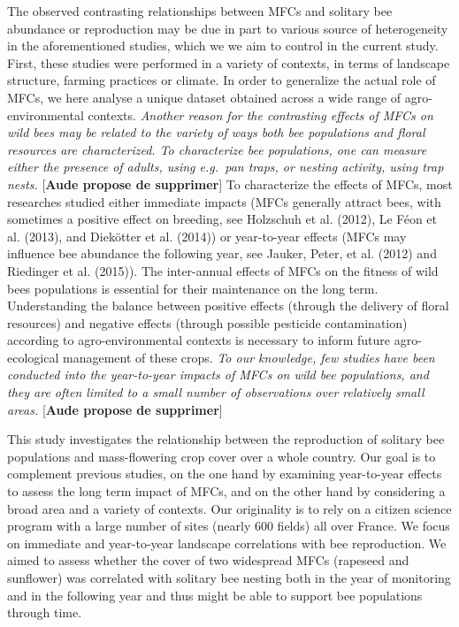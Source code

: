 \documentclass[smallextended]{svjour3}       %
\begin{document}
The observed contrasting relationships between MFCs and solitary bee
abundance or reproduction may be due in part to various source of
heterogeneity in the aforementioned studies, which we we aim to control
in the current study. First, these studies were performed in a variety
of contexts, in terms of landscape structure, farming practices or
climate. In order to generalize the actual role of MFCs, we here analyse
a unique dataset obtained across a wide range of agro-environmental
contexts. \emph{Another reason for the contrasting effects of MFCs on
wild bees may be related to the variety of ways both bee populations and
floral resources are characterized. To characterize bee populations, one
can measure either the presence of adults, using e.g.~pan traps, or
nesting activity, using trap nests.} {[}\textbf{Aude propose de
supprimer}{]} To characterize the effects of MFCs, most researches
studied either immediate impacts (MFCs generally attract bees, with
sometimes a positive effect on breeding, see Holzschuh et al. (2012), Le
Féon et al. (2013), and Diekötter et al. (2014)) or year-to-year effects
(MFCs may influence bee abundance the following year, see Jauker, Peter,
et al. (2012) and Riedinger et al. (2015)). The inter-annual effects of
MFCs on the fitness of wild bees populations is essential for their
maintenance on the long term. Understanding the balance between positive
effects (through the delivery of floral resources) and negative effects
(through possible pesticide contamination) according to
agro-environmental contexts is necessary to inform future
agro-ecological management of these crops. \emph{To our knowledge, few
studies have been conducted into the year-to-year impacts of MFCs on
wild bee populations, and they are often limited to a small number of
observations over relatively small areas.} {[}\textbf{Aude propose de
supprimer}{]}

This study investigates the relationship between the reproduction of
solitary bee populations and mass-flowering crop cover over a whole
country. Our goal is to complement previous studies, on the one hand by
examining year-to-year effects to assess the long term impact of MFCs,
and on the other hand by considering a broad area and a variety of
contexts. Our originality is to rely on a citizen science program with a
large number of sites (nearly 600 fields) all over France. We focus on
immediate and year-to-year landscape correlations with bee reproduction.
We aimed to assess whether the cover of two widespread MFCs (rapeseed
and sunflower) was correlated with solitary bee nesting both in the year
of monitoring and in the following year and thus might be able to
support bee populations through time.
\end{document}
